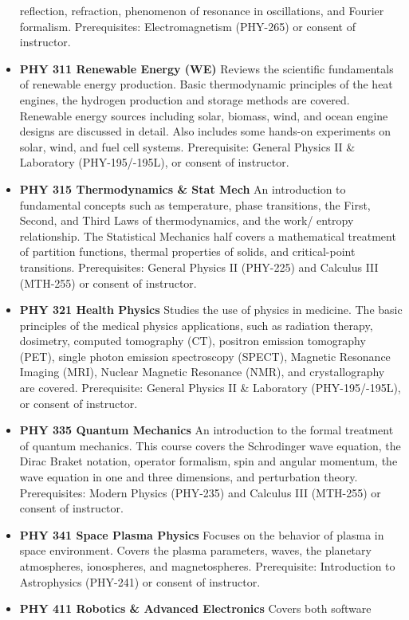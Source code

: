 \documentclass[
  letterpaper,
]{scrbook}
\begin{document}
\begin{itemize}
  reflection, refraction, phenomenon of resonance in oscillations, and
  Fourier formalism. Prerequisites: Electromagnetism (PHY-265) or
  consent of instructor.
\item
  \textbf{PHY 311 Renewable Energy (WE)} Reviews the scientific
  fundamentals of renewable energy production. Basic thermodynamic
  principles of the heat engines, the hydrogen production and storage
  methods are covered. Renewable energy sources including solar,
  biomass, wind, and ocean engine designs are discussed in detail. Also
  includes some hands-on experiments on solar, wind, and fuel cell
  systems. Prerequisite: General Physics II \& Laboratory
  (PHY-195/-195L), or consent of instructor.
\item
  \textbf{PHY 315 Thermodynamics \& Stat Mech} An introduction to
  fundamental concepts such as temperature, phase transitions, the
  First, Second, and Third Laws of thermodynamics, and the work/ entropy
  relationship. The Statistical Mechanics half covers a mathematical
  treatment of partition functions, thermal properties of solids, and
  critical-point transitions. Prerequisites: General Physics II
  (PHY-225) and Calculus III (MTH-255) or consent of instructor.
\item
  \textbf{PHY 321 Health Physics} Studies the use of physics in
  medicine. The basic principles of the medical physics applications,
  such as radiation therapy, dosimetry, computed tomography (CT),
  positron emission tomography (PET), single photon emission
  spectroscopy (SPECT), Magnetic Resonance Imaging (MRI), Nuclear
  Magnetic Resonance (NMR), and crystallography are covered.
  Prerequisite: General Physics II \& Laboratory (PHY-195/-195L), or
  consent of instructor.
\item
  \textbf{PHY 335 Quantum Mechanics} An introduction to the formal
  treatment of quantum mechanics. This course covers the Schrodinger
  wave equation, the Dirac Braket notation, operator formalism, spin and
  angular momentum, the wave equation in one and three dimensions, and
  perturbation theory. Prerequisites: Modern Physics (PHY-235) and
  Calculus III (MTH-255) or consent of instructor.
\item
  \textbf{PHY 341 Space Plasma Physics} Focuses on the behavior of
  plasma in space environment. Covers the plasma parameters, waves, the
  planetary atmospheres, ionospheres, and magnetospheres. Prerequisite:
  Introduction to Astrophysics (PHY-241) or consent of instructor.
\item
  \textbf{PHY 411 Robotics \& Advanced Electronics} Covers both software

\end{itemize}
\end{document}
